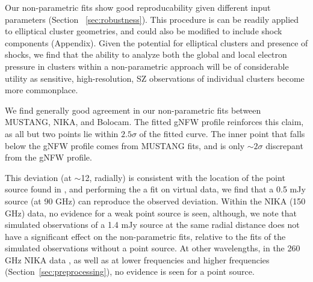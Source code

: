 \documentclass[twocolumn,traditabstract]{aa}
\begin{document}
Our non-parametric fits show good reproducability given different input parameters (Section ~\ref{sec:robustness}).
This procedure is can be readily applied to elliptical cluster geometries, and could also be modified
to include shock components (Appendix). Given the potential for elliptical clusters and presence of shocks,
we find that the ability to analyze both the global and local electron pressure in clusters within a
non-parametric approach will be of considerable utility as sensitive, high-resolution,
SZ observations of individual clusters become more commonplace.


We find generally good agreement in our non-parametric fits
between MUSTANG, NIKA, and Bolocam. The fitted gNFW profile reinforces this claim, as all but two points
lie within $2.5\sigma$ of the fitted curve. The inner point that falls below the gNFW profile comes from
MUSTANG fits, and is only $\sim 2\sigma$ discrepant from the gNFW profile.

This deviation (at $\sim$12\asec, radially) is consistent with the location of the point source found in
\citet{korngut2011}, and performing the a fit on virtual data, we find that a 0.5 mJy source (at 90 GHz)
can reproduce the observed deviation. Within the NIKA (150 GHz) data, no evidence for a weak point source is seen,
although, we note that simulated observations of a 1.4 mJy source at the same radial distance does not have a
significant effect on the non-parametric fits, relative to the fits of the simulated observations without a point source.
At other wavelengths, in the 260 GHz NIKA data \citep{adam2015}, as well as at lower frequencies and higher frequencies
(Section~\ref{sec:preprocessing}), no evidence is seen for a point source.


\end{document}
